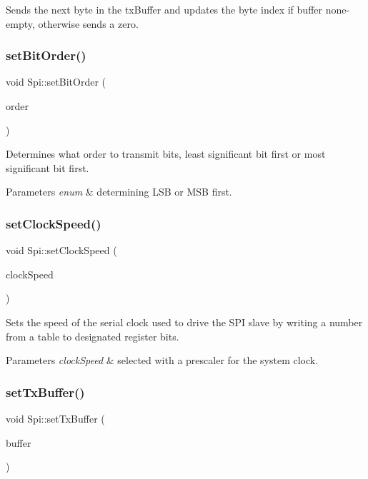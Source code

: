 Sends the next byte in the tx\+Buffer and updates the byte index if buffer none-\/empty, otherwise sends a zero. \mbox{\label{class_spi_aee3ca300877494f2c66be7c99d831ee1}} 
\subsubsection{\texorpdfstring{set\+Bit\+Order()}{setBitOrder()}}
{\footnotesize\ttfamily void Spi\+::set\+Bit\+Order (\begin{DoxyParamCaption}\item[{Spi\+Bit\+Order}]{order }\end{DoxyParamCaption})}

Determines what order to transmit bits, least significant bit first or most significant bit first. 
\begin{DoxyParams}{Parameters}
{\em enum} & determining L\+SB or M\+SB first. \\
\hline
\end{DoxyParams}
\mbox{\label{class_spi_af36b174c9f4ab3dcd3d1b24587d396c8}} 
\subsubsection{\texorpdfstring{set\+Clock\+Speed()}{setClockSpeed()}}
{\footnotesize\ttfamily void Spi\+::set\+Clock\+Speed (\begin{DoxyParamCaption}\item[{Spi\+Clock\+Speed}]{clock\+Speed }\end{DoxyParamCaption})}

Sets the speed of the serial clock used to drive the S\+PI slave by writing a number from a table to designated register bits.


\begin{DoxyParams}{Parameters}
{\em clock\+Speed} & selected with a prescaler for the system clock. \\
\hline
\end{DoxyParams}
\mbox{\label{class_spi_a11ab7b1a91e22d08a43ae08d94ca447d}} 
\subsubsection{\texorpdfstring{set\+Tx\+Buffer()}{setTxBuffer()}}
{\footnotesize\ttfamily void Spi\+::set\+Tx\+Buffer (\begin{DoxyParamCaption}\item[{\mbox{\hyperlink{classr2k_1_1ivector}{r2k\+::ivector}}$<$ u8 $>$ \&}]{buffer }\end{DoxyParamCaption})}

